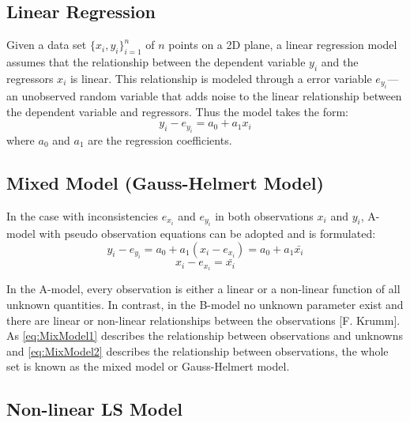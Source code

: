 \subsection{Linear Regression}
\label{subsec:LinearRegression}

Given a data set $\{x_i,y_i\}^n_{i=1}$ of $n$ points on a 2D plane, a linear regression model assumes that the relationship between the dependent variable $y_i$ and the regressors $x_i$ is linear. This relationship is modeled through a error variable $e_{y_i}$--- an unobserved random variable that adds noise to the linear relationship between the dependent variable and regressors.
Thus the model takes the form:
\begin{equation} \label{eq:SimpleLinearRegression}
y_i - e_{y_i} = a_0 + a_1x_i
\end{equation}
where $a_0$ and $a_1$ are the regression coefficients.


\subsection{Mixed Model (Gauss-Helmert Model)}
\label{subsec:MixedModel}

In the case with inconsistencies $e_{x_i}$ and $e_{y_i}$ in both observations $x_i$ and $y_i$, A-model with pseudo observation equations can be adopted and is formulated:
\begin{equation} \label{eq:MixModel1}
y_i - e_{y_i} = a_0 + a_1(x_i-e_{x_i}) = a_0 + a_1\bar{x_i}
\end{equation}
\begin{equation} \label{eq:MixModel2}
x_i-e_{x_i} = \bar{x_i}
\end{equation}

In the A-model, every observation is either a linear or a non-linear function of all unknown quantities. In contrast, in the B-model no unknown parameter exist and there are linear or non-linear relationships between the observations [F. Krumm]. As \eqref{eq:MixModel1} describes the relationship between observations and unknowns and \eqref{eq:MixModel2} describes the relationship between observations, the whole set is known as the mixed model or Gauss-Helmert model.




\subsection{Non-linear LS Model}
\label{subsec:NonLinear}

